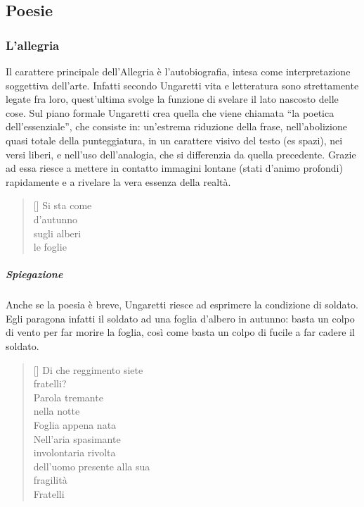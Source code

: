 \documentclass[10pt]{report}
\begin{document}
		
		\subsection{Poesie}
		
		\subsubsection{L'allegria}

		Il carattere principale dell’Allegria è l’autobiografia, intesa come interpretazione soggettiva dell’arte. 
		Infatti secondo Ungaretti vita e letteratura sono strettamente legate fra loro, quest’ultima svolge la funzione di svelare il lato nascosto delle cose. 
		Sul piano formale Ungaretti crea quella che viene chiamata “la poetica dell’essenziale”, che consiste in: un’estrema riduzione della frase, nell’abolizione quasi totale della punteggiatura, in un carattere visivo del testo (es spazi), nei versi liberi, e nell’uso dell’analogia, che si differenzia da quella precedente. 
		Grazie ad essa riesce a mettere in contatto immagini lontane (stati d’animo profondi) rapidamente e a rivelare la vera essenza della realtà.
		
		
		\renewcommand{\poemtoc}{subsection}
		\settowidth{\versewidth}{There was an old party of Lyme}
		
		\begin{verse}[\versewidth]
			Si sta come\\
			d'autunno\\
			sugli alberi\\
			le foglie\\
		\end{verse}
		
		\subparagraph[Soldati]{Spiegazione}Anche se la poesia è breve, Ungaretti riesce ad esprimere la condizione di soldato. Egli paragona infatti il soldato ad una foglia d'albero in autunno: basta un colpo di vento per far morire la foglia, così come basta un colpo di fucile a far cadere il soldato.
		
		\onecolumn
			\renewcommand{\poemtoc}{subsection}
		\settowidth{\versewidth}{There was an old party of Lyme}
		
		\begin{verse}[\versewidth]
			Di che reggimento siete\\
			fratelli?\\
			
			Parola tremante\\
			nella notte\\
			
			Foglia appena nata\\
			
			Nell'aria spasimante\\
			involontaria rivolta\\
			dell'uomo presente alla sua\\
			fragilità\\
			
			Fratelli\\
		\end{verse}
			
\end{document}
